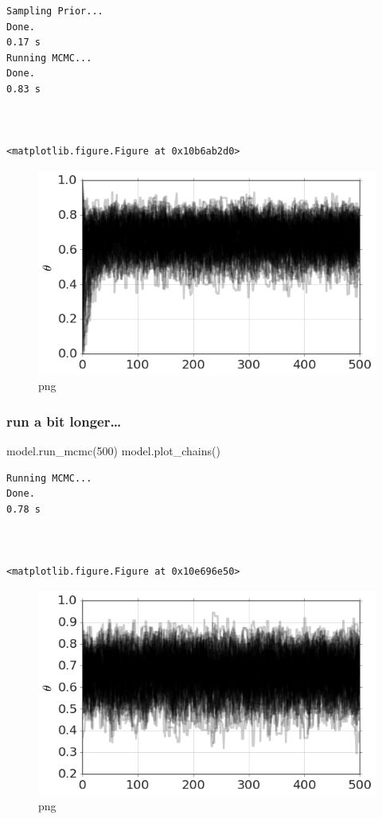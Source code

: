 \documentclass[]{article}
\newenvironment{Shaded}{}{}
\newcommand{\DecValTok}[1]{\textcolor[rgb]{0.25,0.63,0.44}{{#1}}}
\newcommand{\NormalTok}[1]{{#1}}
\begin{document}
\begin{verbatim}
Sampling Prior...
Done.
0.17 s
Running MCMC...
Done.
0.83 s



<matplotlib.figure.Figure at 0x10b6ab2d0>
\end{verbatim}

\begin{figure}[htbp]
\centering
\includegraphics{output_6_2.png}
\caption{png}
\end{figure}

\subsubsection{run a bit longer\ldots{}}\label{run-a-bit-longer}

\begin{Shaded}
\begin{Highlighting}[]
\NormalTok{model.run_mcmc(}\DecValTok{500}\NormalTok{)}
\NormalTok{model.plot_chains()}
\end{Highlighting}
\end{Shaded}

\begin{verbatim}
Running MCMC...
Done.
0.78 s



<matplotlib.figure.Figure at 0x10e696e50>
\end{verbatim}

\begin{figure}[htbp]
\centering
\includegraphics{output_8_2.png}
\caption{png}
\end{figure}
\end{document}
